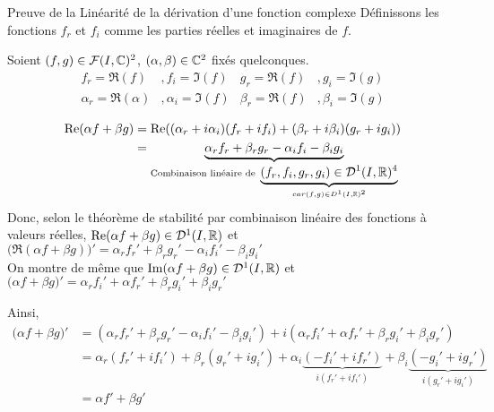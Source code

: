 \documentclass{article}
\renewenvironment{question_kholle}[2][ ]
{
	\subsection{\texorpdfstring{#2}{}}
	\notblank{#1}
	{
		\noindent #1
		\bigbreak
	}
	{}
	\begin{proof}
}
{
	\end{proof}
}
\begin{document}
\begin{question_kholle}{Preuve de la Linéarité de la dérivation d'une fonction complexe}
	Définissons les fonctions $f_r$ et $f_i$ comme les parties réelles et imaginaires de $f$.

	Soient $(f, g) \in \mathcal{F}(I, \mathbb C)^2$, $(\alpha, \beta) \in \mathbb C^2$ fixés quelconques.
	\begin{align*}
		f_r = \Re(f) &, f_i = \Im(f) &g_r = \Re(f) &, g_i = \Im(g)\\
		\alpha_r = \Re(\alpha) &, \alpha_i = \Im(f) &\beta_r = \Re(f) &, \beta_i = \Im(g)
	\end{align*}
	
	\begin{align*}
		\text{Re}( \alpha f + \beta g) &= \text{Re}((\alpha_r + i \alpha_i)(f_r + i f_i) + (\beta_r+ i\beta_i)(g_r+ i g_i)) \\
		&= \underbrace{\alpha_r f_r + \beta_r g_r - \alpha_i f_i - \beta_i g_i}_{\text{Combinaison linéaire de } \underbrace{(f_r, f_i, g_r, g_i) \in \mathcal D^1(I, \mathbb R)^4}_{car (f,g) \in D^1(I, \mathbb R)^2}}
	\end{align*}
	Donc, selon le théorème de stabilité par combinaison linéaire des fonctions à valeurs réelles, $\text{Re}(\alpha f + \beta g) \in \mathcal D^1(I, \mathbb R)$ et $\big(\Re(\alpha f + \beta g)\big)' = \alpha_r f_r' + \beta_r g_r' - \alpha_i f_i' - \beta_i g_i'$
	\\
	On montre de même que $\text{Im}(\alpha f + \beta g) \in \mathcal D^1(I, \mathbb R)$ et $\big(\alpha f + \beta g\big)' = \alpha_r f_i' +\alpha f_r' +\beta_r g_i' +\beta_i g_r'$
	
	Ainsi,
	\begin{align*}
		\big( \alpha f + \beta g \big)' &= (\alpha_r f_r' + \beta_r g_r' - \alpha_i f_i' - \beta_i g_i') + i (\alpha_r f_i' +\alpha f_r' +\beta_r g_i' +\beta_i g_r') \\
		&= \alpha_r(f_r' + if_i') + \beta_r(g_r' + ig_i') + \alpha_i \underbrace{(-f_i' + if_r')}_{i(f_r' + if_i')} + \beta_i \underbrace{( -g_i' + ig_r')}_{i(g_r' + ig_i')} \\
		&=\alpha f' + \beta g'
	\end{align*}
\end{question_kholle}
\end{document}
